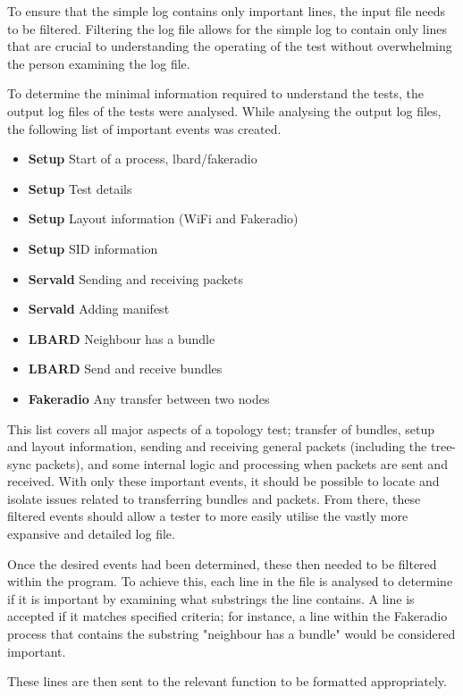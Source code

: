 To ensure that the simple log contains only important lines, the input file needs to be filtered.
Filtering the log file allows for the simple log to contain only lines that are crucial to understanding the operating of the test without overwhelming the person examining the log file.

To determine the minimal information required to understand the tests, the output log files of the tests were analysed.
While analysing the output log files, the following list of important events was created.
\begin{itemize}
    \item \textbf{Setup} Start of a process, lbard/fakeradio
    \item \textbf{Setup} Test details
    \item \textbf{Setup} Layout information (WiFi and Fakeradio)
    \item \textbf{Setup} SID information
    \item \textbf{Servald} Sending and receiving packets
    \item \textbf{Servald} Adding manifest
    \item \textbf{LBARD} Neighbour has a bundle
    \item \textbf{LBARD} Send and receive bundles
    \item \textbf{Fakeradio} Any transfer between two nodes
\end{itemize}
This list covers all major aspects of a topology test; transfer of bundles, setup and layout information, sending and receiving general packets (including the tree-sync packets), and some internal logic and processing when packets are sent and received.
With only these important events, it should be possible to locate and isolate issues related to transferring bundles and packets. 
From there, these filtered events should allow a tester to more easily utilise the vastly more expansive and detailed log file. 


Once the desired events had been determined, these then needed to be filtered within the program.
To achieve this, each line in the file is analysed to determine if it is important by examining what substrings the line contains.
A line is accepted if it matches specified criteria; for instance, a line within the Fakeradio process that contains the substring "neighbour has a bundle" would be considered important.

These lines are then sent to the relevant function to be formatted appropriately.

